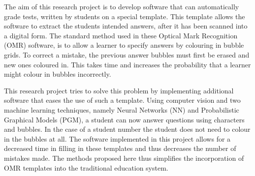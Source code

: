 


\begin{abstracts}        %
The aim of this research project is to develop software that can automatically grade tests, written by students on a special template. This template allows the software to extract the students intended answers, after it has been scanned into a digital form. The standard method used in these Optical Mark Recognition (OMR) software, is to allow a learner to specify answers by colouring in bubble grids. To correct a mistake, the previous answer bubbles must first be erased and new ones coloured in. This takes time and increases the probability that a learner might colour in bubbles incorrectly. 

This research project tries to solve this problem by implementing additional software that eases the use of such a template. Using computer vision and two machine learning techniques, namely Neural Networks (NN) and Probabilistic Graphical Models (PGM), a student can now answer questions using characters and bubbles. In the case of a student number the student does not need to colour in the bubbles at all. The software implemented in this project allows for a decreased time in filling in these templates and thus decreases the number of mistakes made. The methods proposed here thus simplifies the incorporation of OMR templates into the traditional education system.
\end{abstracts}
